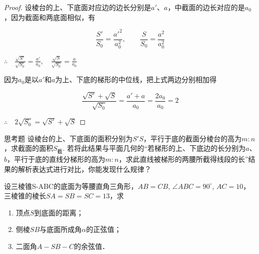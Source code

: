 \begin{proof}
设棱台的上、下底面对应边的边长分别是$a'$、$a$，中截面的边长对应的是$a_0$，因为截面和两底面相似，有


\noindent
\begin{minipage}{.68\textwidth}\CTEXindent
\[\frac{S'}{S_0}=\frac{{a'}^2}{a^2_0},\qquad \frac{S}{S_0}=\frac{{a}^2}{a^2_0}\]

$\therefore\quad \frac{\sqrt{S'}}{\sqrt{S_0}}=\frac{a'}{a_0},\quad \frac{\sqrt{S}}{\sqrt{S_0}}=\frac{a}{a_0}$

因为$a_0$是以$a'$和$a$为上、下底的梯形的中位线，把上式两边分别相加得
\end{minipage}
\hfill
\begin{minipage}{.3\textwidth}
\centering
{}
\end{minipage}

\[\frac{\sqrt{S'}+\sqrt{S}}{\sqrt{S_0}}=\frac{a'+a}{a_0}=\frac{2a_0}{a_0}=2\]

$\therefore\quad 2\sqrt{S_0}=\sqrt{S'}+\sqrt{S}$
\end{proof}

\begin{thm}
 {思考题}
设棱台的上、下底面的面积分别为$S'S$，平行于底的截面分棱台的高为$m:n$，求截面的面积$S_{\text{截}}$. 若将此结果与平面几何的“若梯形的上、下底边的长分别为$a$、$b$，平行于底的直线分梯形的高为$m:n$，求此直线被梯形的两腰所截得线段的长”结果的解析表达式进行对比，你能发现什么规律？   
\end{thm}

\begin{example}
    设三棱锥S-ABC的底面为等腰直角三角形，$AB=CB$, $\angle ABC=90^{\circ}$, $AC=10$，三棱锥的棱长$SA=SB=SC=13$，求
\begin{enumerate}[(1)]
\item 顶点$S$到底面的距离；
\item 侧棱$SB$与底面所成角$\alpha$的正弦值；
\item 二面角$A-SB-C$的余弦值．
\end{enumerate}
\end{example}

